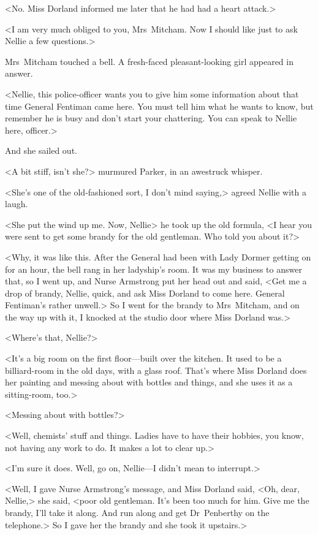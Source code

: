 <No. Miss Dorland informed me later that he had had a heart attack.>

<I am very much obliged to you, Mrs~Mitcham. Now I should like just to ask Nellie a few questions.>

Mrs~Mitcham touched a bell. A fresh-faced pleasant-looking girl appeared in answer.

<Nellie, this police-officer wants you to give him some information about that time General Fentiman came here. You must tell him what he wants to know, but remember he is busy and don't start your chattering. You can speak to Nellie here, officer.>

And she sailed out.

<A bit stiff, isn't she?> murmured Parker, in an awestruck whisper.

<She's one of the old-fashioned sort, I don't mind saying,> agreed Nellie with a laugh.

<She put the wind up me. Now, Nellie\longdash> he took up the old formula, <I hear you were sent to get some brandy for the old gentleman. Who told you about it?>

<Why, it was like this. After the General had been with Lady Dormer getting on for an hour, the bell rang in her ladyship's room. It was my business to answer that, so I went up, and Nurse Armstrong put her head out and said, <Get me a drop of brandy, Nellie, quick, and ask Miss Dorland to come here. General Fentiman's rather unwell.> So I went for the brandy to Mrs~Mitcham, and on the way up with it, I knocked at the studio door where Miss Dorland was.>

<Where's that, Nellie?>

<It's a big room on the first floor—built over the kitchen. It used to be a billiard-room in the old days, with a glass roof. That's where Miss Dorland does her painting and messing about with bottles and things, and she uses it as a sitting-room, too.>

<Messing about with bottles?>

<Well, chemists' stuff and things. Ladies have to have their hobbies, you know, not having any work to do. It makes a lot to clear up.>

<I'm sure it does. Well, go on, Nellie—I didn't mean to interrupt.>

<Well, I gave Nurse Armstrong's message, and Miss Dorland said, <Oh, dear, Nellie,> she said, <poor old gentleman. It's been too much for him. Give me the brandy, I'll take it along. And run along and get Dr~Penberthy on the telephone.> So I gave her the brandy and she took it upstairs.>

